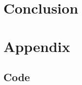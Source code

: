 \documentclass[runningheads]{llncs}
\begin{document}





\section{Conclusion}




\section*{Appendix}
\subsection*{Code}


\end{document}
